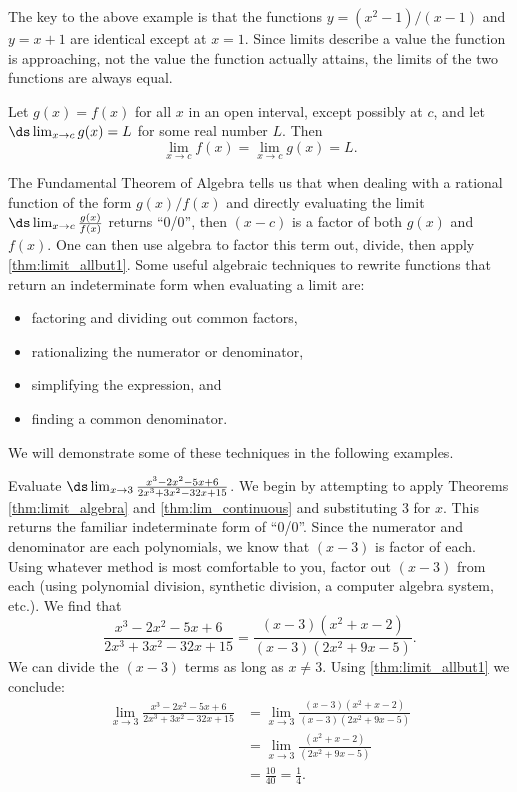The key to the above example is that the functions $y=(x^2-1)/(x-1)$ and $y=x+1$ are identical except at $x=1$. Since limits describe a value the function is approaching, not the value the function actually attains, the limits of the two functions are always equal.

\begin{theorem}\label{thm:limit_allbut1}
Let $g(x) = f(x)$ for all $x$ in an open interval, except possibly at $c$, and let $\ds \lim_{x\to c} g(x) = L$ for some real number $L$. Then
\[\lim_{x\to c} f(x)=\lim_{x\to c} g(x)=L.\]
\end{theorem}

The Fundamental Theorem of Algebra tells us that when dealing with a rational function of the form $g(x)/f(x)$ and directly evaluating the limit $\ds \lim_{x\to c} \frac{g(x)}{f(x)}$ returns ``0/0'', 
then $(x-c)$ is a factor of both $g(x)$ and $f(x)$. One can then use algebra to factor this term out, divide, then apply \autoref{thm:limit_allbut1}. Some useful algebraic techniques to rewrite functions that return an indeterminate form when evaluating a limit are:
\begin{itemize}
\item factoring and dividing out common factors,
\item rationalizing the numerator or denominator,
\item simplifying the expression, and
\item finding a common denominator.
\end{itemize}
We will demonstrate some of these techniques in the following examples.

\begin{example}\label{ex_limit_allbut1}
Evaluate $\ds \lim_{x\to 3} \frac{x^3-2 x^2-5 x+6}{2 x^3+3 x^2-32 x+15}$.
\solution
We begin by attempting to apply Theorems \ref{thm:limit_algebra} and \ref{thm:lim_continuous} and substituting 3 for $x$. This returns the familiar indeterminate form of ``0/0''. %
Since the numerator and denominator are each polynomials, we know that $(x-3)$ is factor of each. Using whatever method is most comfortable to you, factor out $(x-3)$ from each (using polynomial division, synthetic division, a computer algebra system, etc.). We find that
\[
\frac{x^3-2 x^2-5 x+6}{2 x^3+3 x^2-32 x+15}
= \frac{(x-3)(x^2+x-2)}{(x-3)(2 x^2+9 x-5)}.
\]
We can divide the $(x-3)$ terms as long as $x\neq 3$. Using \autoref{thm:limit_allbut1} we conclude:\vspace{-.3\baselineskip}
	\begin{align*}
	\lim_{x\to 3} \frac{x^3-2 x^2-5 x+6}{2 x^3+3 x^2-32 x+15}
	&= \lim_{x\to 3}\frac{(x-3)(x^2+x-2)}{(x-3)(2 x^2+9 x-5)} \\
	&= \lim_{x\to 3} \frac{(x^2+x-2)}{(2 x^2+9 x-5)}\\
	&= \frac{10}{40} = \frac14.
	\end{align*}
\end{example}

